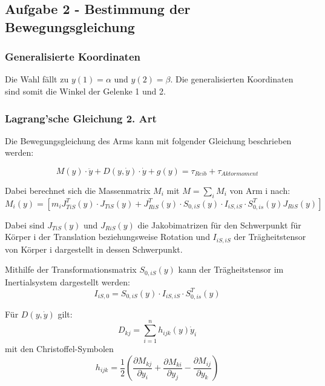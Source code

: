 \subsection*{Aufgabe 2 - Bestimmung der Bewegungsgleichung}

\subsubsection*{Generalisierte Koordinaten}
Die Wahl fällt zu $y(1) = \alpha$ und $y(2) = \beta$. 
Die generalisierten Koordinaten sind somit die Winkel der Gelenke 1 und 2.

\subsubsection*{Lagrang'sche Gleichung 2. Art}
Die Bewegungsgleichung des Arms kann mit folgender Gleichung beschrieben werden:

\begin{equation}
	M(y) \cdot \ddot{y} + D(y,\dot{y}) \cdot \dot{y} + g(y) = \tau_{Reib} + \tau_{Aktormoment}
\end{equation}

Dabei berechnet sich die Massenmatrix $M_{i}$ mit $M = \sum_{i}{M_{i}}$ von Arm i nach:
\begin{equation}
	M_{i}(y) = \left[m_{i}J_{TiS}^{T}(y) \cdot J_{TiS}(y) + 
	J_{RiS}^{T}(y) \cdot S_{0,iS}(y) \cdot I_{iS,iS} \cdot S_{0,is}^{T}(y) J_{RiS}(y) \right]
\end{equation}

Dabei sind $J_{TiS}(y)$ und $J_{RiS}(y)$ die Jakobimatrizen für den Schwerpunkt für Körper 
i der Translation beziehungsweise Rotation und $I_{iS,iS}$
der Trägheitstensor von Körper i dargestellt in dessen Schwerpunkt.

Mithilfe der Transformationsmatrix $S_{0,iS}(y)$ kann der Trägheitstensor im Inertialsystem dargestellt werden:
\begin{equation}
	I_{iS,0} = S_{0,iS}(y) \cdot I_{iS,iS} \cdot S_{0,is}^{T}(y)
\end{equation}


Für  $D(y,\dot{y})$ gilt:
\begin{equation}
	D_{kj} = \sum_{i=1}^{n}h_{ijk}(y)\dot{y}_{i}
\end{equation}
mit den Christoffel-Symbolen
\begin{equation}
	h_{ijk} = \frac{1}{2}\left(	\frac{\partial M_{kj}}{\partial y_{i}} + 
								\frac{\partial M_{ki}}{\partial y_{j }} -
								\frac{\partial M_{ij}}{\partial y_{k}}				\right)
\end{equation}

